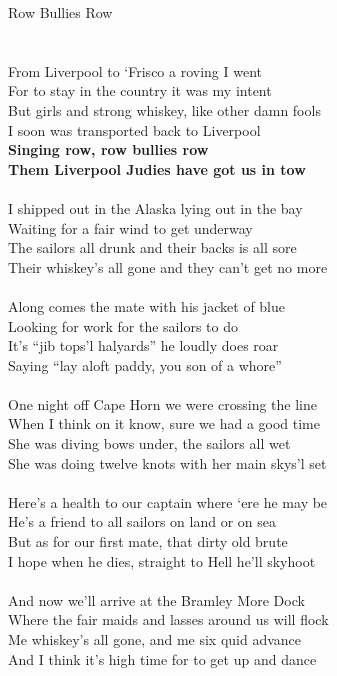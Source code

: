 \documentclass[letterpaper,9pt]{article}
\begin{document}
\newpage
{}
\huge
Row Bullies Row\\
\\
\Large
\\From Liverpool to ‘Frisco a roving I went
\\For to stay in the country it was my intent
\\But girls and strong whiskey, like other damn fools
\\I soon was transported back to Liverpool 
\\\textbf{Singing row, row bullies row
\\Them Liverpool Judies have got us in tow}
\\
\\I shipped out in the Alaska lying out in the bay
\\Waiting for a fair wind to get underway
\\The sailors all drunk and their backs is all sore
\\Their whiskey’s all gone and they can’t get no more
\\
\\Along comes the mate with his jacket of blue
\\Looking for work for the sailors to do
\\It’s “jib tops’l halyards” he loudly does roar
\\Saying “lay aloft paddy, you son of a whore”
\\
\\One night off Cape Horn we were crossing the line
\\When I think on it know, sure we had a good time
\\She was diving bows under, the sailors all wet
\\She was doing twelve knots with her main skys’l set
\\
\\Here’s a health to our captain where ‘ere he may be
\\He’s a friend to all sailors on land or on sea
\\But as for our first mate, that dirty old brute
\\I hope when he dies, straight to Hell he’ll skyhoot
\\
\\And now we’ll arrive at the Bramley More Dock
\\Where the fair maids and lasses around us will flock
\\Me whiskey’s all gone, and me six quid advance
\\And I think it’s high time for to get up and dance
\end{document}
